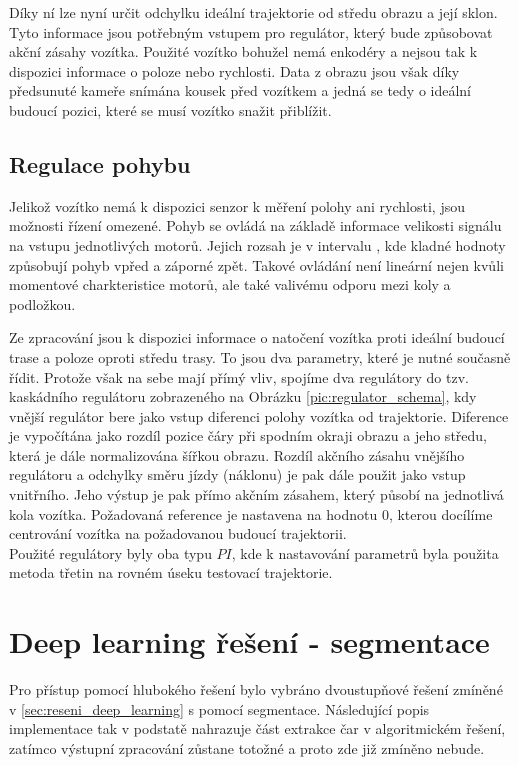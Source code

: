 \documentclass[czech, bc, kky, he, iso690numb]{fasthesis}
\begin{document}
            	Díky ní lze nyní určit odchylku ideální trajektorie od středu obrazu a její sklon. Tyto informace jsou potřebným vstupem pro regulátor, který bude způsobovat akční zásahy vozítka. Použité vozítko bohužel nemá enkodéry a nejsou tak k dispozici informace o poloze nebo rychlosti. Data z obrazu jsou však díky předsunuté kameře snímána kousek před vozítkem a jedná se tedy o ideální budoucí pozici, které se musí vozítko snažit přiblížit.
            	
            \subsection{Regulace pohybu}
                Jelikož vozítko nemá k dispozici senzor k měření polohy ani rychlosti, jsou možnosti řízení omezené. Pohyb se ovládá na základě informace velikosti signálu na vstupu jednotlivých motorů. Jejich rozsah je v intervalu \(<-1,1>\), kde kladné hodnoty způsobují pohyb vpřed a záporné zpět. Takové ovládání není lineární nejen kvůli momentové charkteristice motorů, ale také valivému odporu mezi koly a podložkou.
                
                Ze zpracování jsou k dispozici informace o natočení vozítka proti ideální budoucí trase a poloze oproti středu trasy. To jsou dva parametry, které je nutné současně řídit. Protože však na sebe mají přímý vliv, spojíme dva regulátory do tzv. kaskádního regulátoru zobrazeného na Obrázku \ref{pic:regulator_schema}, kdy vnější regulátor bere jako vstup diferenci polohy vozítka od trajektorie. Diference je vypočítána jako rozdíl pozice čáry při spodním okraji obrazu a jeho středu, která je dále normalizována šířkou obrazu. Rozdíl akčního zásahu vnějšího regulátoru a odchylky směru jízdy (náklonu) je pak dále použit jako vstup vnitřního. Jeho výstup je pak přímo akčním zásahem, který působí na jednotlivá kola vozítka. Požadovaná reference je nastavena na hodnotu \(0\), kterou docílíme centrování vozítka na požadovanou budoucí trajektorii.\\
                Použité regulátory byly oba typu \(PI\), kde k nastavování parametrů byla použita metoda třetin na rovném úseku testovací trajektorie.
                
        \section{Deep learning řešení - segmentace}
        	Pro přístup pomocí hlubokého řešení bylo vybráno dvoustupňové řešení zmíněné v \ref{sec:reseni_deep_learning} s pomocí segmentace. Následující popis implementace tak v podstatě nahrazuje část extrakce čar v algoritmickém řešení, zatímco výstupní zpracování zůstane totožné a proto zde již zmíněno nebude.
        	
\end{document}
